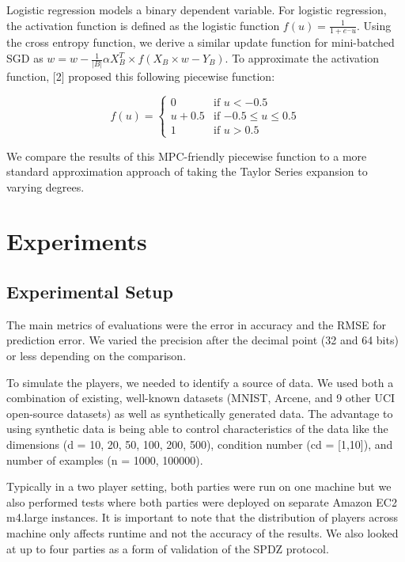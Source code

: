 \documentclass{article}
\begin{document}
Logistic regression models a binary dependent variable. For logistic regression, the activation function is defined as the logistic function $f(u) = \frac{1}{1+e^-u}$. Using the cross entropy function, we derive a similar update function for mini-batched SGD as $ w = w - \frac{1}{|B|} \alpha X^{T}_{B} \times f(X_{B} \times w - Y_{B})$. To approximate the activation function, [2] proposed this following piecewise function:

\[
  f(u) =
  \begin{cases}
                                   0 & \text{if $u < -0.5$} \\
                                   u + 0.5 & \text{if $-0.5 \leq u \leq 0.5$} \\
1 & \text{if $u > 0.5$}
  \end{cases}
\]

We compare the results of this MPC-friendly piecewise function to a more standard approximation approach of taking the Taylor Series expansion to varying degrees.

\section{Experiments}

\subsection{Experimental Setup}

The main metrics of evaluations were the error in accuracy and the RMSE for prediction error. We varied the precision after the decimal point (32 and 64 bits) or less depending on the comparison.

To simulate the players, we needed to identify a source of data. We used both a combination of existing, well-known datasets (MNIST, Arcene, and 9 other UCI open-source datasets) as well as synthetically generated data. The advantage to using synthetic data is being able to control characteristics of the data like the dimensions (d = 10, 20, 50, 100, 200, 500), condition number (cd = [1,10]), and number of examples (n = 1000, 100000).

Typically in a two player setting, both parties were run on one machine but we also performed tests where both parties were deployed on separate Amazon EC2 m4.large instances. It is important to note that the distribution of players across machine only affects runtime and not the accuracy of the results. We also looked at up to four parties as a form of validation of the SPDZ protocol.
\end{document}
